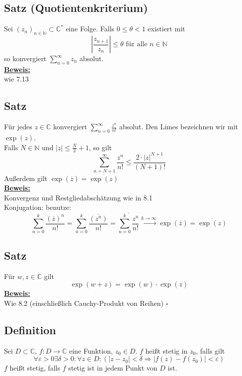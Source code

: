 \subsection{Satz (Quotientenkriterium)} %
\label{sub:satz}
Sei $(z_n)_{n \in \mathds{N}} \subset \mathds{C}^*$ eine Folge. Falls $0 \le \theta < 1$ existiert mit
\[
	\left| \frac{z_{n+1}}{z_n}  \right| \le \theta \text{ für alle } n \in \mathds{N} 
\]
so konvergiert $\sum\limits_{n=0}^{\infty} z_n$ absolut.
\vspace{10pt} \\
\underline{\textbf{Beweis:}} \\
wie 7.13


\subsection{Satz} %
\label{sub:satz}
Für jedes $z\in \mathds{C}$ konvergiert $\sum\limits_{n=0}^{\infty} \frac{z^n}{n!} $ absolut. Den Limes bezeichnen wir mit $\exp (z)$.
\vspace{10pt} \\
Falls $N \in \mathds{N}$ und $|z| \le \frac{N}{2} +1 $, so gilt
\[
	\sum\limits_{n=N+1}^{\infty} \frac{z^n}{n!} \le \frac{2 \cdot |z|^{N+1}}{(N+1)!}
\]
Außerdem gilt $\exp ( \overline{z}) = \overline{\exp (z)}$
\vspace{10pt} \\
\underline{\textbf{Beweis:}} \\
Konvergenz und Restgliedabschätzung wie in 8.1 \\
Konjugation: benutze: 
\[
\sum\limits_{n=0}^{k} \frac{(\overline{z})^n}{n!} = \sum\limits_{n=0}^{k} \frac{\overline{(z^n)}}{n!}  = 
\overline{\sum\limits_{n=0}^{k} \frac{z^n}{n!}}  \xrightarrow{k \to \infty} \exp (\overline{z}) = \overline{\exp (z)}
\]

\subsection{Satz} %
\label{sub:satz}
Für $w,z \in \mathds{C}$ gilt 
\[
	\exp (w+z) = \exp (w) \cdot  \exp (z)
\]
\underline{\textbf{Beweis:}} \\
Wie 8.2 (einschließlich Cauchy-Produkt von Reihen) \hfill \( \square \)

\subsection{Definition} %
\label{sub:definition}
Sei $D \subset \mathds{C}$, $f: D \to \mathds{C}$ eine Funktion, $z_0 \in D$. $f$ heißt stetig in $z_0$, falls gilt
\[
	\forall \varepsilon > 0 \exists \delta >0 : \forall z \in D: (|z-z_0| < \delta  \Rightarrow |f(z)- f(z_0)| < \varepsilon)
\]
$f$ heißt stetig, falls $f$ stetig ist in jedem Punkt von $D$ ist.

